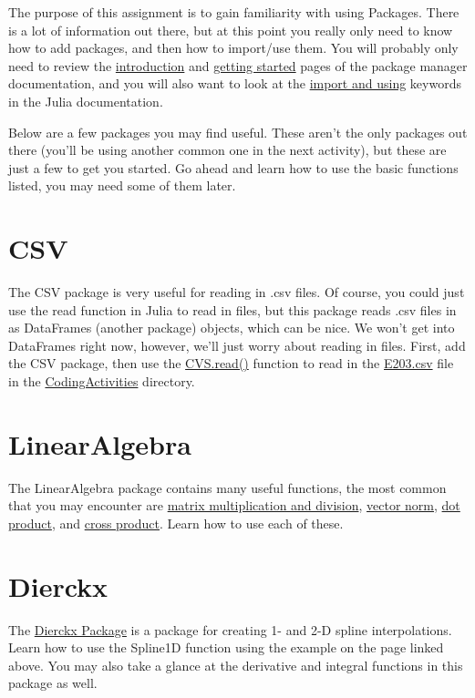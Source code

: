 \documentclass{article}%
\begin{document}
The purpose of this assignment is to gain familiarity with using Packages. There is a lot of information out there, but at this point you really only need to know how to add packages, and then how to import/use them. You will probably only need to review the \href{https://julialang.github.io/Pkg.jl/v1/}{introduction} and \href{https://julialang.github.io/Pkg.jl/v1/getting-started/}{getting started} pages of the package manager documentation, and you will also want to look at the \href{https://docs.julialang.org/en/v1/base/base/#import}{import and using} keywords in the Julia documentation.

Below are a few packages you may find useful. These aren't the only packages out there (you'll be using another common one in the next activity), but these are just a few to get you started. Go ahead and learn how to use the basic functions listed, you may need some of them later.

\section*{CSV}

The CSV package is very useful for reading in .csv files. Of course, you could just use the read function in Julia to read in files, but this package reads .csv files in as DataFrames (another package) objects, which can be nice. We won't get into DataFrames right now, however, we'll just worry about reading in files. First, add the CSV package, then use the \href{http://juliadata.github.io/CSV.jl/v0.1.1/index.html#CSV.read}{CVS.read()} function to read in the \href{https://github.com/byuflowlab/undergrad-onboarding/blob/master/TheFirstSemester/CodingActivities/E203.csv}{E203.csv} file in the \href{https://github.com/byuflowlab/undergrad-onboarding/tree/master/TheFirstSemester/CodingActivities}{CodingActivities} directory.

\section*{LinearAlgebra}

The LinearAlgebra package contains many useful functions, the most common that you may encounter are \href{https://docs.julialang.org/en/v1/stdlib/LinearAlgebra/index.html#Standard-Functions-1}{matrix multiplication and division}, \href{https://docs.julialang.org/en/v1/stdlib/LinearAlgebra/index.html#LinearAlgebra.dot}{vector norm}, \href{https://docs.julialang.org/en/v1/stdlib/LinearAlgebra/index.html#LinearAlgebra.dot}{dot product}, and \href{https://docs.julialang.org/en/v1/stdlib/LinearAlgebra/index.html#LinearAlgebra.cross}{cross product}. Learn how to use each of these.

\section*{Dierckx}

The \href{https://github.com/kbarbary/Dierckx.jl}{Dierckx Package} is a package for creating 1- and 2-D spline interpolations. Learn how to use the Spline1D function using the example on the page linked above. You may also take a glance at the derivative and integral functions in this package as well.
\end{document}

